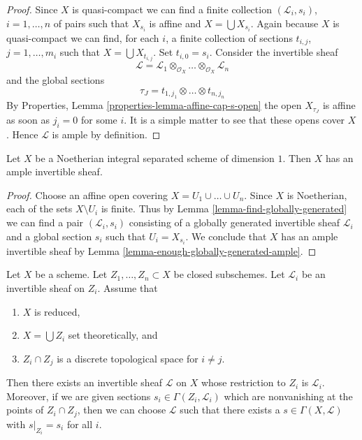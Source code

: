 \begin{proof}
Since $X$ is quasi-compact we can find a finite collection
$(\mathcal{L}_i, s_i)$, $i = 1, \ldots, n$
of pairs such that $X_{s_i}$ is affine and $X = \bigcup X_{s_i}$.
Again because $X$ is quasi-compact we can find, for each $i$, a finite
collection of sections $t_{i, j}$, $j = 1, \ldots, m_i$
such that $X = \bigcup X_{t_{i, j}}$. Set $t_{i, 0} = s_i$.
Consider the invertible sheaf
$$
\mathcal{L} = \mathcal{L}_1 
\otimes_{\mathcal{O}_X} \ldots
\otimes_{\mathcal{O}_X} \mathcal{L}_n
$$
and the global sections
$$
\tau_J = t_{1, j_1} \otimes \ldots \otimes t_{n, j_n}
$$
By Properties, Lemma \ref{properties-lemma-affine-cap-s-open}
the open $X_{\tau_J}$ is affine as soon as $j_i = 0$ for some $i$.
It is a simple matter to see that these opens cover $X$.
Hence $\mathcal{L}$ is ample by definition.
\end{proof}

\begin{lemma}
\label{lemma-dim-1-noetherian-integral-separated-has-ample}
Let $X$ be a Noetherian integral separated scheme of dimension $1$.
Then $X$ has an ample invertible sheaf.
\end{lemma}

\begin{proof}
Choose an affine open covering $X = U_1 \cup \ldots \cup U_n$.
Since $X$ is Noetherian, each of the sets $X \setminus U_i$ is finite.
Thus by Lemma \ref{lemma-find-globally-generated}
we can find a pair $(\mathcal{L}_i, s_i)$
consisting of a globally generated invertible sheaf $\mathcal{L}_i$
and a global section $s_i$ such that $U_i = X_{s_i}$.
We conclude that $X$ has an ample invertible sheaf by
Lemma \ref{lemma-enough-globally-generated-ample}.
\end{proof}

\begin{lemma}
\label{lemma-glue-invertible-sheaves}
Let $X$ be a scheme. Let $Z_1, \ldots, Z_n \subset X$ be closed
subschemes. Let $\mathcal{L}_i$ be an invertible sheaf on $Z_i$.
Assume that
\begin{enumerate}
\item $X$ is reduced,
\item $X = \bigcup Z_i$ set theoretically, and
\item $Z_i \cap Z_j$ is a discrete topological space for $i \not = j$.
\end{enumerate}
Then there exists an invertible sheaf $\mathcal{L}$ on $X$ whose restriction
to $Z_i$ is $\mathcal{L}_i$. Moreover, if we are given sections
$s_i \in \Gamma(Z_i, \mathcal{L}_i)$ which are nonvanishing at the
points of $Z_i \cap Z_j$, then we can choose $\mathcal{L}$ such
that there exists a $s \in \Gamma(X, \mathcal{L})$ with
$s|_{Z_i} = s_i$ for all $i$.
\end{lemma}

